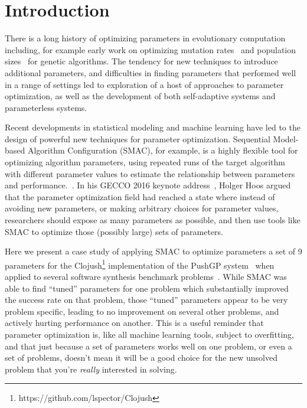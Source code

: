 \section{Introduction}
\label{sec:introduction}

There is a long history of optimizing parameters in evolutionary computation
including, for example early work on optimizing mutation rates~\cite{back1993optimal} and 
population sizes~\cite{alander1992optimal} for genetic algorithms.
The tendency for new techniques to introduce additional parameters, 
and difficulties in finding parameters that performed well in a range of
settings led to exploration of a host of approaches to parameter
optimization, as well as the development of both self-adaptive systems
and parameterless systems.~\cite{lobo2007parameter}

Recent developments in statistical modeling and machine learning have
led to the design of powerful new techniques for parameter optimization. 
Sequential Model-based Algorithm Configuration (SMAC), for example, is a
highly flexible tool for optimizing algorithm parameters, using repeated runs
of the target algorithm with different parameter values to estimate
the relationship between parameters and performance.~\cite{HutHooLey11-SMAC}. In his GECCO 2016 keynote 
address~\cite{Hoos:2016:TCM:2908812.2908960}, Holger Hoos argued
that the parameter optimization field had reached a state where 
instead of avoiding new
parameters, or making arbitrary choices for parameter values, researchers
should expose as many parameters as possible, and then use tools like
SMAC to optimize those (possibly large) sets of parameters.

Here we present a case study of applying SMAC to optimize parameters a
set of 9 parameters for the Clojush\footnote{https://github.com/lspector/Clojush} 
implementation of the PushGP system~\cite{spector:2002:GPEM,push3gecco}
when applied to several software synthesis 
benchmark problems~\cite{Helmuth:2015:GECCO}. While SMAC was able to
find ``tuned'' parameters for one problem which substantially improved
the success rate on that problem, those ``tuned'' parameters appear to
be very problem specific, leading to no improvement on several other
problems, and actively hurting performance on another. This is a useful
reminder that parameter optimization is, like all machine learning tools,
subject to overfitting, and that just because a set of parameters works 
well on one problem, or even a set of problems, doesn't mean it will be
a good choice for the new unsolved problem that you're \emph{really}
interested in solving.

